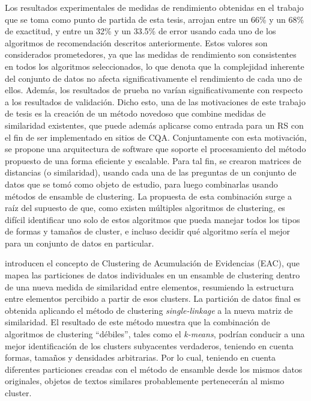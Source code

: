 \bigskip Los resultados experimentales de medidas de rendimiento obtenidas en el trabajo que se toma como punto de partida de esta tesis, arrojan entre un 66\% y un 68\% de exactitud, y entre un 32\% y un 33.5\% de error usando cada uno de los algoritmos de recomendación descritos anteriormente. Estos valores son considerados prometedores, ya que las medidas de rendimiento son consistentes en todos los algoritmos seleccionados, lo que denota que la complejidad inherente del conjunto de datos no afecta significativamente el rendimiento de cada uno de ellos. Además, los resultados de prueba no varían significativamente con respecto a los resultados de validación. Dicho esto, una de las motivaciones de este trabajo de tesis es la creación de un método novedoso que combine medidas de similaridad existentes, que puede además aplicarse como entrada para un RS con el fin de ser implementado en sitios de CQA. Conjuntamente con esta motivación, se propone una arquitectura de software que soporte el procesamiento del método propuesto de una forma eficiente y escalable. Para tal fin, se crearon matrices de distancias (o similaridad), usando cada una de las preguntas de un conjunto de datos que se tomó como objeto de estudio, para luego combinarlas usando métodos de ensamble de clustering. La propuesta de esta combinación surge a raíz del supuesto de que, como existen múltiples algoritmos de clustering, es difícil identificar uno solo de estos algoritmos que pueda manejar todos los tipos de formas y tamaños de cluster, e incluso decidir qué algoritmo sería el mejor para un conjunto de datos en particular.

\bigskip \cite{fred2005combining} introducen el concepto de Clustering de Acumulación de Evidencias (EAC), que mapea las particiones de datos individuales en un ensamble de clustering dentro de una nueva medida de similaridad entre elementos, resumiendo la estructura entre elementos percibido a partir de esos clusters. La partición de datos final es obtenida aplicando el método de clustering \textit{single-linkage} a la nueva matriz de similaridad. El resultado de este método muestra que la combinación de algoritmos de clustering “débiles”, tales como el \textit{k-means}, podrían conducir a una mejor identificación de los clusters subyacentes verdaderos, teniendo en cuenta formas, tamaños y densidades arbitrarias. Por lo cual, teniendo en cuenta diferentes particiones creadas con el método de ensamble desde los mismos datos originales, objetos de textos similares probablemente pertenecerán al mismo cluster.

